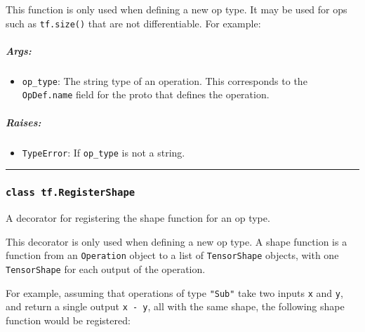This function is only used when defining a new op type. It may be used
for ops such as \lstinline{tf.size()} that are not differentiable. For
example:

\begin{Shaded}
\begin{Highlighting}[]
\NormalTok{)}
\end{Highlighting}
\end{Shaded}

\subparagraph{Args: }\label{args-29}

\begin{itemize}
\tightlist
\item
  \lstinline{op_type}: The string type of an operation. This corresponds
  to the \lstinline{OpDef.name} field for the proto that defines the
  operation.
\end{itemize}

\subparagraph{Raises: }\label{raises-16}

\begin{itemize}
\tightlist
\item
  \lstinline{TypeError}: If \lstinline{op_type} is not a string.
\end{itemize}

\begin{center}\rule{0.5\linewidth}{\linethickness}\end{center}

\subsubsection{\texorpdfstring{\lstinline{class tf.RegisterShape}
}{class tf.RegisterShape }}\label{class-tf.registershape}

A decorator for registering the shape function for an op type.

This decorator is only used when defining a new op type. A shape
function is a function from an \lstinline{Operation} object to a list of
\lstinline{TensorShape} objects, with one \lstinline{TensorShape} for each
output of the operation.

For example, assuming that operations of type \lstinline{"Sub"} take two
inputs \lstinline{x} and \lstinline{y}, and return a single output
\lstinline{x - y}, all with the same shape, the following shape function
would be registered:

\begin{Shaded}
\begin{Highlighting}[]
\NormalTok{(}\NormalTok{)}
 
   \NormalTok{[op.inputs[}\NormalTok{].get_shape().merge_with(op.inputs[}\NormalTok{].get_shape())]}
\end{Highlighting}
\end{Shaded}

